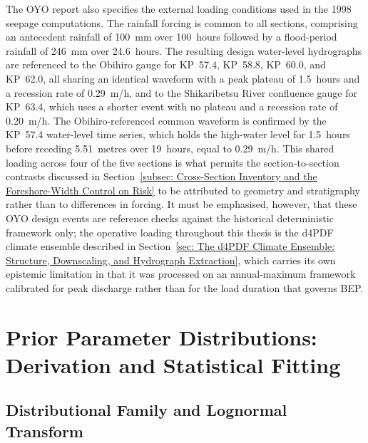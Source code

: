 The OYO report also specifies the external loading conditions used in the 1998 seepage computations. The rainfall forcing is common to all sections, comprising an antecedent rainfall of 100~mm over 100~hours followed by a flood-period rainfall of 246~mm over 24.6~hours. The resulting design water-level hydrographs are referenced to the Obihiro gauge for KP~57.4, KP~58.8, KP~60.0, and KP~62.0, all sharing an identical waveform with a peak plateau of 1.5~hours and a recession rate of 0.29~m/h, and to the Shikaribetsu River confluence gauge for KP~63.4, which uses a shorter event with no plateau and a recession rate of 0.20~m/h. The Obihiro-referenced common waveform is confirmed by the KP~57.4 water-level time series, which holds the high-water level for 1.5~hours before receding 5.51~metres over 19~hours, equal to 0.29~m/h. This shared loading across four of the five sections is what permits the section-to-section contrasts discussed in Section~\ref{subsec: Cross-Section Inventory and the Foreshore-Width Control on Risk} to be attributed to geometry and stratigraphy rather than to differences in forcing. It must be emphasised, however, that these OYO design events are reference checks against the historical deterministic framework only; the operative loading throughout this thesis is the d4PDF climate ensemble described in Section~\ref{sec: The d4PDF Climate Ensemble: Structure, Downscaling, and Hydrograph Extraction}, which carries its own epistemic limitation in that it was processed on an annual-maximum framework calibrated for peak discharge rather than for the load duration that governs BEP.

\section{Prior Parameter Distributions: Derivation and Statistical Fitting}
\label{sec: Prior Parameter Distributions: Derivation and Statistical Fitting}

\subsection{Distributional Family and Lognormal Transform}
\label{subsec: Distributional Family and Lognormal Transform}

